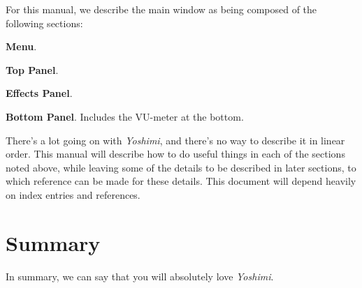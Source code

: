 \documentclass[
 11pt,
 twoside,
 a4paper,
 headinclude,
 footinclude,
 final                                 %
]{article}
\begin{document}
   For this manual, we describe the main window as being composed of
   the following sections:

\begin{enumber}
   \item \textbf{Menu}.
   \item \textbf{Top Panel}.
   \item \textbf{Effects Panel}.
   \item \textbf{Bottom Panel}.  Includes the VU-meter at the bottom.
\end{enumber}

There's a lot going on with \textsl{Yoshimi}, and there's no way
to describe it in linear order.  This manual will describe how to do useful
things in each of the sections noted above, while leaving some of the
details to be described in later sections, to which reference can be made
for these details.  This document will depend heavily on index entries and
references.








































\section{Summary}
\label{sec:summary}

In summary, we can say that you will absolutely love \textsl{Yoshimi}.




\printindex
\end{document}
